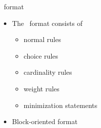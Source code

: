 \begin{frame}{\smodels\ format}
  \medskip
  \begin{itemize}
  \item The \smodels\ format consists of
    \begin{itemize}
    \item normal rules
    \item choice rules
    \item cardinality rules
    \item weight rules
    \item minimization statements
    \end{itemize}
    \medskip
  \item Block-oriented format
  \end{itemize}
\end{frame}
